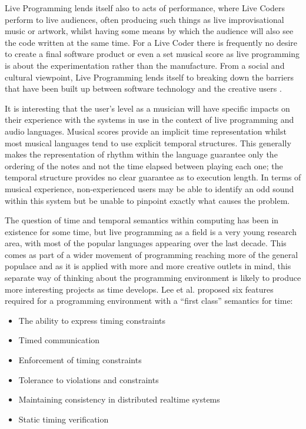 \documentclass[11pt]{scrartcl}
\begin{document}
Live Programming lends itself also to acts of performance, where Live Coders 
perform to live audiences, often producing such things as live 
improvisational music or artwork, whilst having some means by which the 
audience will also see the code written at the same time. For a Live Coder 
there is frequently no desire to create a final software product or even a set 
musical score as live programming is about the experimentation rather than the 
manufacture. From a social and cultural viewpoint, Live Programming lends 
itself to breaking down the barriers that have been built up between software 
technology and the creative users \cite{McL13}.

It is interesting that the user's level as a musician will have specific 
impacts on their experience with the systems in use in the context of live 
programming and audio languages. Musical scores provide an implicit time 
representation whilst most musical languages tend to use explicit temporal 
structures. This generally makes the representation of rhythm within the 
language guarantee only the ordering of the notes and not the time elapsed 
between playing each one; the temporal structure provides no clear guarantee as 
to execution length. In terms of musical experience, non-experienced 
users may be able to identify an odd sound within this system but be unable to 
pinpoint exactly what causes the problem. 

The question of time and temporal semantics within computing has been in 
existence for some time, but live programming as a field is a very young 
research area, with most of the popular languages appearing over the last 
decade. This comes as part of a wider movement of programming reaching more of 
the general populace and as it is applied with more and more creative outlets 
in mind, this separate way of thinking about the programming environment is 
likely to produce more interesting projects as time develops. Lee et al. 
\cite{LDW87} proposed six features required for a programming environment with a 
``first class'' semantics for time:

\begin{itemize}
	\item The ability to express timing constraints
	\item Timed communication
	\item Enforcement of timing constraints
	\item Tolerance to violations and constraints
	\item Maintaining consistency in distributed realtime systems
	\item Static timing verification
\end{itemize}
\end{document}
